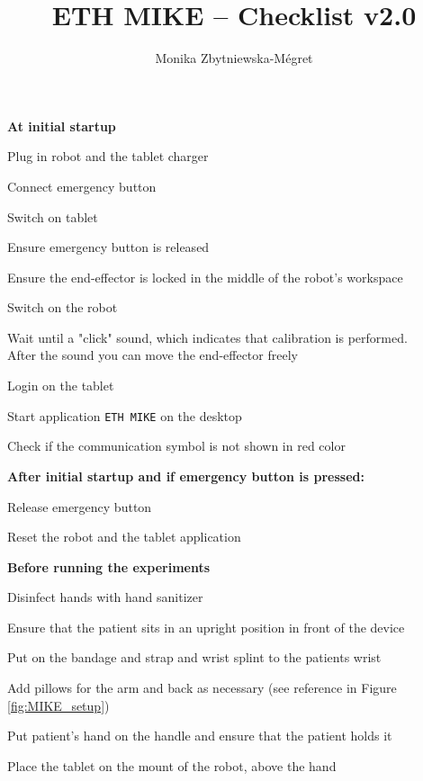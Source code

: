 \documentclass[11pt,a4paper]{paper}
\begin{document}
\title{\vspace{-1cm}ETH MIKE -- Checklist v2.0}

\author{Monika Zbytniewska-Mégret}

\maketitle

\vfill

\textbf{At initial startup}
\begin{todolist}
	\setlength\itemsep{-0.25em}
	\item Plug in robot and the tablet charger
	\item Connect emergency button
	\item Switch on tablet
	\item Ensure emergency button is released
	\item Ensure the end-effector is locked in the middle of the robot's workspace
	\item Switch on the robot
	\item Wait until a "click" sound, which indicates that calibration is performed. \\ After the sound you can move the end-effector freely 
	\item Login on the tablet
	\item Start application \texttt{ETH MIKE} on the desktop
	\item Check if the communication symbol is not shown in red color
\end{todolist}

\textbf{After initial startup and if emergency button is pressed:}
\begin{todolist}
	\setlength\itemsep{-0.25em}
	\item Release emergency button
	\item Reset the robot and the tablet application 
\end{todolist}

\textbf{Before running the experiments}
\begin{todolist}
	\setlength\itemsep{-0.25em}
	\item Disinfect hands with hand sanitizer
	\item Ensure that the patient sits in an upright position in front of the device
	\item Put on the bandage and strap and wrist splint to the patients wrist
	\item Add pillows for the arm and back as necessary (see reference in Figure \ref{fig:MIKE_setup})
	\item Put patient's hand on the handle and ensure that the patient holds it
	\item Place the tablet on the mount of the robot, above the hand
\end{todolist}
\end{document}

